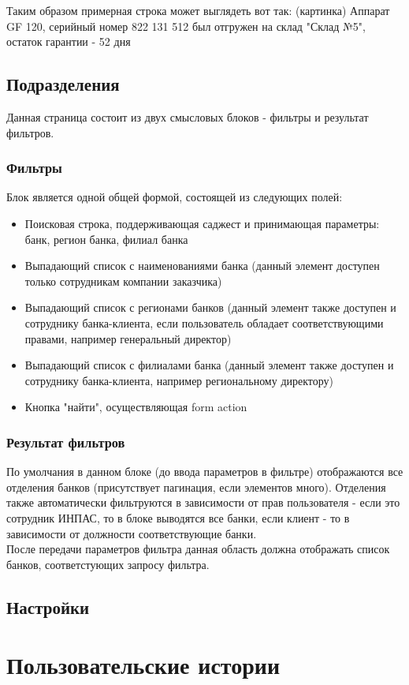 \documentclass[DIV=calc, paper=a4, fontsize=11pt]{scrartcl} %
\begin{document}
Таким образом примерная строка может выглядеть вот так:
(картинка) Аппарат GF 120, серийный номер 822 131 512 был отгружен на склад "Склад №5", остаток гарантии - 52 дня

\subsection{Подразделения}
Данная страница состоит из двух смысловых блоков - фильтры и результат фильтров.

\subsubsection{Фильтры}
Блок является одной общей формой, состоящей из следующих полей:
\begin{itemize}
	\item Поисковая строка, поддерживающая саджест и принимающая параметры: банк, регион банка, филиал банка
	\item Выпадающий список с наименованиями банка (данный элемент доступен только сотрудникам компании заказчика)
	\item Выпадающий список с регионами банков (данный элемент также доступен и сотруднику банка-клиента, если пользователь обладает соответствующими правами, например генеральный директор)
	\item Выпадающий список с филиалами банка (данный элемент также доступен и сотруднику банка-клиента, например региональному директору)
	\item Кнопка "найти", осуществляющая form action 
\end{itemize}

\subsubsection{Результат фильтров}
По умолчания в данном блоке (до ввода параметров в фильтре) отображаются все отделения банков (присутствует пагинация, если элементов много). Отделения также автоматически фильтруются в зависимости от прав пользователя - если это сотрудник ИНПАС, то в блоке выводятся все банки, если клиент - то в зависимости от должности соответствующие банки.
\\[0.5cm]
После передачи параметров фильтра данная область должна отображать список банков, соответстующих запросу фильтра.


\subsection{Настройки}

\section{Пользовательские истории}
\end{document}

